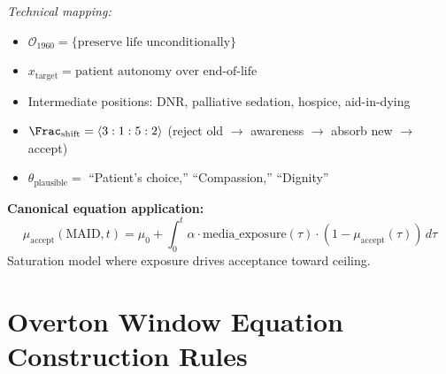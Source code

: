 \begin{tcolorbox}[colback=yellow!5!white,colframe=yellow!65!black,title=\textbf{Real-Life Scenarios: Overton Window Shifts},breakable]
\textit{Technical mapping:}
\begin{itemize}
    \item $\mathcal{O}_{1960} = \{\text{preserve life unconditionally}\}$
    \item $x_{\mathrm{target}} = \text{patient autonomy over end-of-life}$
    \item Intermediate positions: DNR, palliative sedation, hospice, aid-in-dying
    \item $\Frac_{\mathrm{shift}} = \langle 3 : 1 : 5 : 2 \rangle$ (reject old $\to$
          awareness $\to$ absorb new $\to$ accept)
    \item $\theta_{\mathrm{plausible}} =$ ``Patient's choice,'' ``Compassion,''
          ``Dignity''
\end{itemize}

\textbf{Canonical equation application:}
\[
    \mu_{\mathrm{accept}}(\text{MAID}, t) = \mu_0 +
    \int_0^t \alpha \cdot \mathrm{media\_exposure}(\tau) \cdot
    (1 - \mu_{\mathrm{accept}}(\tau)) \, d\tau
\]
Saturation model where exposure drives acceptance toward ceiling.

\end{tcolorbox}

\section{Overton Window Equation Construction Rules}
\label{sec:overton-construction}

